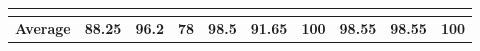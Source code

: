 \begin{adjustbox}{width=\textwidth}
\begin{tabular}{|l|ccc|ccc|ccc|}
	& \multicolumn{1}{l}{} & \multicolumn{1}{l}{} & \multicolumn{1}{l|}{} & \multicolumn{1}{l}{}          & \multicolumn{1}{l}{}         & \multicolumn{1}{l|}{}         & \multicolumn{1}{l}{}            & \multicolumn{1}{l}{}            & \multicolumn{1}{l|}{}            \\ \hline
	\textbf{Average}                                           & \textbf{88.25}       & \textbf{96.2}        & \textbf{78}           & \textbf{98.5}                 & \textbf{91.65}               & \textbf{100}                  & \textbf{98.55}                  & \textbf{98.55}                  & \textbf{100}                     \\ \hline
\end{tabular}
\end{adjustbox}